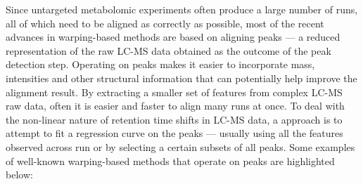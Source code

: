 Since untargeted metabolomic experiments often produce a large number of runs, all of which need to be aligned as correctly as possible, most of the recent advances in warping-based methods are based on aligning peaks --- a reduced representation of the raw LC-MS data obtained as the outcome of the peak detection step. Operating on peaks makes it easier to incorporate mass, intensities and other structural information that can potentially help improve the alignment result. By extracting a smaller set of features from complex LC-MS raw data, often it is easier and faster to align many runs at once. To deal with the non-linear nature of retention time shifts in LC-MS data, a approach is to attempt to fit a regression curve on the peaks --- usually using all the features observed across run or by selecting a certain subsets of all peaks. Some examples of well-known warping-based methods that operate on peaks are highlighted below: 

